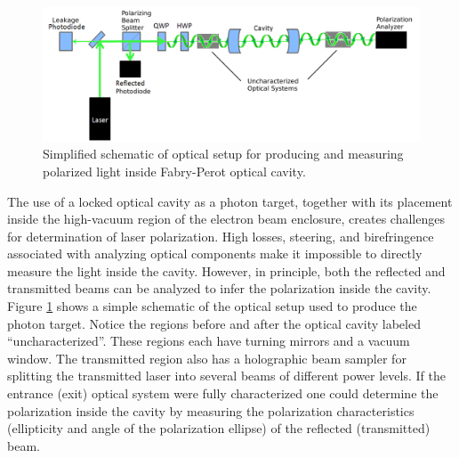 \begin{figure}[ht]
\centering
\includegraphics[width=5.5in]{./Pictures/optical_schematic.png}
\caption{\label{fig:optical_schematic}Simplified schematic of optical setup for producing and measuring polarized light inside Fabry-Perot optical cavity.}
\end{figure}

The use of a locked optical cavity as a photon target, together with its placement inside the high-vacuum region of the electron beam enclosure, creates challenges for determination of laser polarization. High losses, steering, and birefringence associated with analyzing optical components make it impossible to directly measure the light inside the cavity. However, in principle, both the reflected and transmitted beams can be analyzed to infer the polarization inside the cavity. Figure \ref{fig:optical_schematic} shows a simple schematic of the optical setup used to produce the photon target. Notice the regions before and after the optical cavity labeled ``uncharacterized''. These regions each have turning mirrors and a vacuum window. The transmitted region also has a holographic beam sampler for splitting the transmitted laser into several beams of different power levels. If the entrance (exit) optical system were fully characterized one could determine the polarization inside the cavity by measuring the polarization characteristics (ellipticity and angle of the polarization ellipse) of the reflected (transmitted) beam. 

